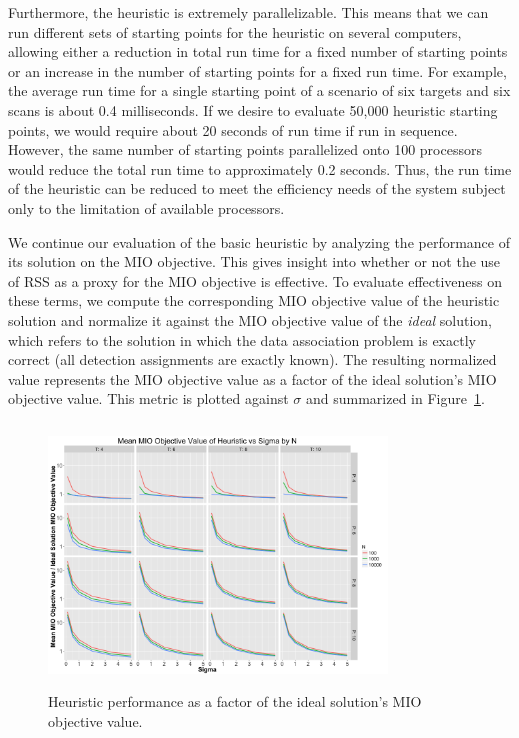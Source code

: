 \documentclass[journal]{IEEEtran}
\begin{document}
Furthermore, the heuristic is extremely parallelizable. This means that we can run different sets of starting points for the heuristic on several computers, allowing either a reduction in total run time for a fixed number of starting points or an increase in the number of starting points for a fixed run time. For example, the average run time for a single starting point of a scenario of six targets and six scans is about 0.4 milliseconds. If we desire to evaluate 50,000 heuristic starting points, we would require about 20 seconds of run time if run in sequence. However, the same number of starting points parallelized onto 100 processors would reduce the total run time to approximately 0.2 seconds. Thus, the run time of the heuristic can be reduced to meet the efficiency needs of the system subject only to the limitation of available processors. 

We continue our evaluation of the basic heuristic by analyzing the performance of its solution on the MIO objective. This gives insight into whether or not the use of RSS as a proxy for the MIO objective is effective. To evaluate effectiveness on these terms, we compute the corresponding MIO objective value of the heuristic solution and normalize it against the MIO objective value of the \textit{ideal} solution, which refers to the solution in which the data association problem is exactly correct (all detection assignments are exactly known). The resulting normalized value represents the MIO objective value as a factor of the ideal solution's MIO objective value. This metric is plotted against $\sigma$ and summarized in Figure~\ref{fig:Basic_Heuristic_Objective}. 

\begin{figure}[h]
  \centering
  \includegraphics[width=9cm, height=7cm]{Basic_Heuristic_Objective}
  \caption{Heuristic performance as a factor of the ideal solution's MIO objective value.}
  \label{fig:Basic_Heuristic_Objective}
\end{figure}
\end{document}
